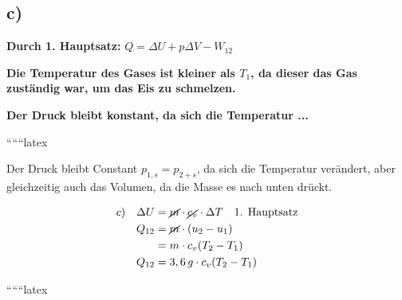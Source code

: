 

\subsection*{c)}

\textbf{Durch 1. Hauptsatz:} $Q = \Delta U + p \Delta V - W_{12}$

\textbf{Die Temperatur des Gases ist kleiner als $T_1$, da dieser das Gas zuständig war, um das Eis zu schmelzen.}

\textbf{Der Druck bleibt konstant, da sich die Temperatur ...}

``````latex


Der Druck bleibt Constant \( p_{1,s} = p_{2+s} \), da sich die Temperatur verändert, aber gleichzeitig auch das Volumen, da die Masse es nach unten drückt.

\begin{equation*}
\begin{aligned}

c) \quad \Delta U &= \cancel{m} \cdot \cancel{c_v} \cdot \Delta T \quad \text{1. Hauptsatz} \\
Q_{12} &= \cancel{m} \cdot (u_2 - u_1) \\
&= m \cdot c_v (T_2 - T_1) \\
Q_{12} &= 3,6 \, g \cdot c_v (T_2 - T_1)
\end{aligned}
\end{equation*}

``````latex